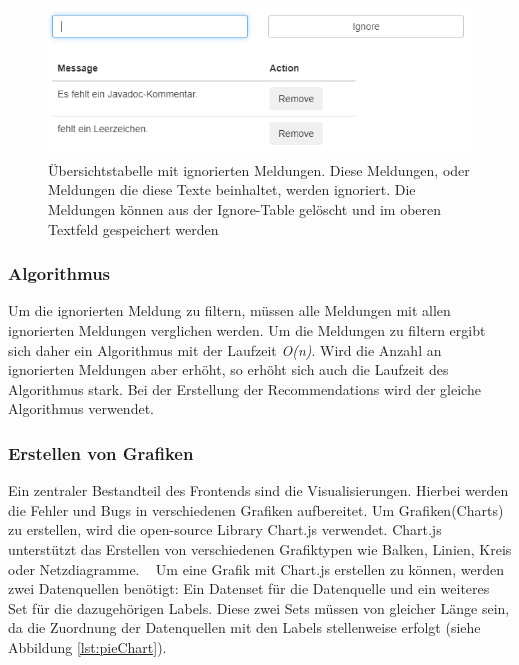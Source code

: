 \begin{figure}[tp]
  \centering
  \includegraphics[height=4cm]{images/ignoreTable.PNG}
 \caption[Übersichtstabelle mit ignorierten Meldungen. Diese Meldungen, oder Meldungen die diese Texte beinhaltet, werden ignoriert. Die Meldungen können aus der Ignore-Table gelöscht und im oberen Textfeld gespeichert werden.]{Übersichtstabelle mit ignorierten Meldungen. Diese Meldungen, oder Meldungen die diese Texte beinhaltet, werden ignoriert. Die Meldungen können aus der Ignore-Table gelöscht und im oberen Textfeld gespeichert werden}
  \label{fig:ignoredMessages}
\end{figure}

\subsubsection*{Algorithmus}
Um die ignorierten Meldung zu filtern, müssen alle Meldungen mit allen ignorierten Meldungen verglichen werden. Um die Meldungen zu filtern ergibt sich daher ein Algorithmus mit der Laufzeit \textit{O(n)}. Wird die Anzahl an ignorierten Meldungen aber erhöht, so erhöht sich auch die Laufzeit des Algorithmus stark. Bei der Erstellung der Recommendations wird der gleiche Algorithmus verwendet.

\subsubsection{Erstellen von Grafiken}
Ein zentraler Bestandteil des Frontends sind die Visualisierungen. Hierbei werden die Fehler und Bugs in verschiedenen Grafiken aufbereitet. Um Grafiken(Charts) zu erstellen, wird die open-source Library Chart.js verwendet. Chart.js unterstützt das Erstellen von verschiedenen Grafiktypen wie Balken, Linien, Kreis oder Netzdiagramme. ~\parencite{chartJsHelder} Um eine Grafik mit Chart.js erstellen zu können, werden zwei Datenquellen benötigt: Ein Datenset für die Datenquelle und ein weiteres Set für die dazugehörigen Labels. Diese zwei Sets müssen von gleicher Länge sein, da die Zuordnung der Datenquellen mit den Labels stellenweise erfolgt (siehe Abbildung \ref{lst:pieChart}).


